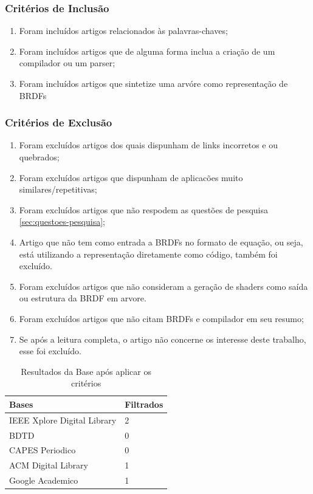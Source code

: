 \documentclass[english, 
               brazil, 
               bsc] %
               {dcomp-abntex2}
\begin{document}
\subsubsection{Critérios de Inclusão}

\begin{enumerate}
  \item Foram incluídos artigos relacionados às palavras-chaves;
  \item Foram incluídos artigos que de alguma forma inclua a criação de um compilador ou um parser;
  \item Foram incluídos artigos que sintetize uma arvóre como representação de BRDFs
\end{enumerate}

\subsubsection{Critérios de Exclusão}

\begin{enumerate}
  \item Foram excluídos artigos dos quais dispunham de links incorretos e ou quebrados;
  \item Foram excluídos artigos que dispunham de aplicacões muito similares/repetitivas;
  \item Foram excluídos artigos que não respodem as questões de pesquisa \ref{sec:questoes-pesquisa};
  \item Artigo que não tem como entrada a BRDFs no formato de equação, ou seja, está utilizando a representação diretamente como código, também foi excluído.
  \item Foram excluídos artigos que não consideram a geração de shaders como saída ou estrutura da BRDF em arvore.
  \item Foram excluídos artigos que não citam BRDFs e compilador em seu resumo;
  \item Se após a leitura completa, o artigo não concerne os interesse deste trabalho, esse foi excluído.
\end{enumerate}


\begin{table}[H]
\ABNTEXfontereduzida
  \caption[bases]{Resultados da Base após aplicar os critérios}
\label{tab-bases}
\begin{tabular}{p{6.6cm}|p{6.6cm}}
   \textbf{Bases}  & \textbf{Filtrados}\\
   \hline
    IEEE Xplore Digital Library
   & 2
    \\ \hline
    BDTD
    & 0
    \\ \hline
    CAPES Periodico
    & 0
    \\ \hline

  ACM Digital Library
  & 1
    \\ \hline
 Google Academico 
  & 1
\end{tabular}
\end{table}
\end{document}
